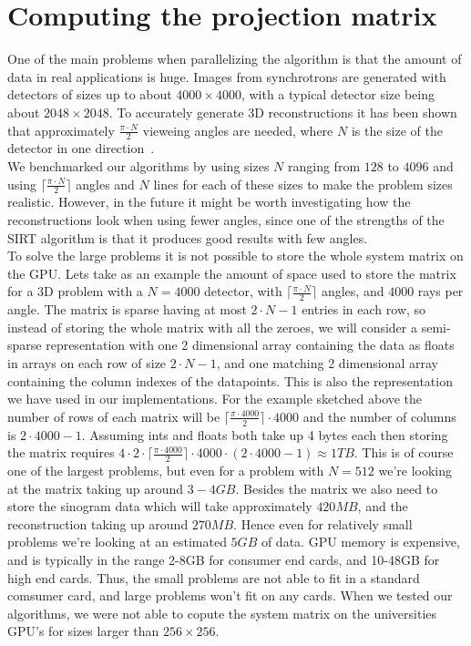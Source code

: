 \section{Computing the projection matrix}
One of the main problems when parallelizing the algorithm is that the amount of data in real applications is huge. Images from synchrotrons are generated with detectors of sizes up to about $4000\times4000$, with a typical detector size being about $2048\times2048$. To accurately generate 3D reconstructions it has been shown that approximately $\frac{\pi\cdot N}{2}$ vieweing angles are needed, where $N$ is the size of the detector in one direction~\cite{natterer2001}.\\
We benchmarked our algorithms by using sizes $N$ ranging from $128$ to $4096$ and using $\lceil\frac{\pi\cdot N}{2}\rceil$ angles and $N$ lines for each of these sizes to make the problem sizes realistic. However, in the future it might be worth investigating how the reconstructions look when using fewer angles, since one of the strengths of the SIRT algorithm is that it produces good results with few angles.\\
To solve the large problems it is not possible to store the whole system matrix on the GPU. Lets take as an example the amount of space used to store the matrix for a 3D problem with a $N=4000$ detector, with $\lceil\frac{\pi\cdot N}{2}\rceil$ angles, and $4000$ rays per angle. The matrix is sparse having at most $2\cdot N-1$ entries in each row, so instead of storing the whole matrix with all the zeroes, we will consider a semi-sparse representation with one 2 dimensional array containing the data as floats in arrays on each row of size  $2\cdot N-1$, and one matching 2 dimensional array containing the column indexes of the datapoints. This is also the representation we have used in our implementations. For the example sketched above the number of rows of each matrix will be $\lceil\frac{\pi\cdot4000}{2}\rceil\cdot4000$ and the number of columns is $2\cdot 4000-1$. Assuming ints and floats both take up 4 bytes each then storing the matrix requires $4\cdot 2\cdot\lceil\frac{ \pi \cdot 4000}{2} \rceil \cdot 4000 \cdot (2 \cdot 4000-1) \approx1TB$. This is of course one of the largest problems, but even for a problem with $N=512$ we're looking at the matrix taking up around $3-4GB$. Besides the matrix we also need to store the sinogram data which will take approximately $420MB$, and the reconstruction taking up around $270MB$. Hence even for relatively small problems we're looking at an estimated $5GB$ of data. GPU memory is expensive, and is typically in the range 2-8GB for consumer end cards, and 10-48GB for high end cards. Thus, the small problems are not able to fit in a standard comsumer card, and large problems won't fit on any cards. When we tested our algorithms, we were not able to copute the system matrix on the universities GPU's for sizes larger than $256\times256$.\\
